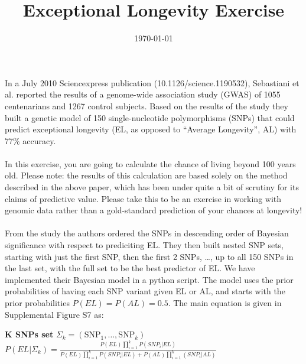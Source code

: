 \documentclass[a4paper, 12pt]{article}
\title{Exceptional Longevity Exercise}
\date{\today}
\begin{document}
\maketitle

\paragraph{} 
  In a July 2010 Sciencexpress publication (10.1126/science.1190532), Sebastiani et al. reported the results of a genome-wide association study (GWAS) of 1055 centenarians and 1267 control subjects. 
  Based on the results of the study they built a genetic model of 150 single-nucleotide polymorphisms (SNPs) that could predict exceptional longevity (EL, as opposed to “Average Longevity”, AL) with 77\% accuracy.

\paragraph{}
  In this exercise, you are going to calculate the chance of living beyond 100 years old.
  Please note: the results of this calculation are based solely on the method described in the above paper, which has been under quite a bit of scrutiny for its claims of predictive value. 
  Please take this to be an exercise in working with genomic data rather than a gold-standard prediction of your chances at longevity!

\paragraph{}
  From the study the authors ordered the SNPs in descending order of Bayesian significance with respect to prediciting EL. 
  They then built nested SNP sets, starting with just the first SNP, then the first 2 SNPs, \ldots, up to all 150 SNPs in the last set, with the full set to be the best predictor of EL.
  We have implemented their Bayesian model in a python script. The model uses the prior probabilities of having each SNP variant given EL or AL, and starts with the prior probabilities $P(EL) = P(AL) = 0.5$. The main equation is given in Supplemental Figure S7 as: \\
  \begin{center}
    \textbf{K SNPs set} $\Sigma_k = (\mathrm{SNP}_1, \ldots, \mathrm{SNP}_k)$ \\
  $P(EL | \Sigma_k) = \frac{P(EL) \prod_{i = 1} ^ k P(SNP_i | EL)}{P(EL) \prod_{i = 1} ^ k P(SNP_i | EL) + P(AL) \prod_{i = 1} ^ k (SNP_i | AL)}$ \\
  \end{center}
\end{document}
